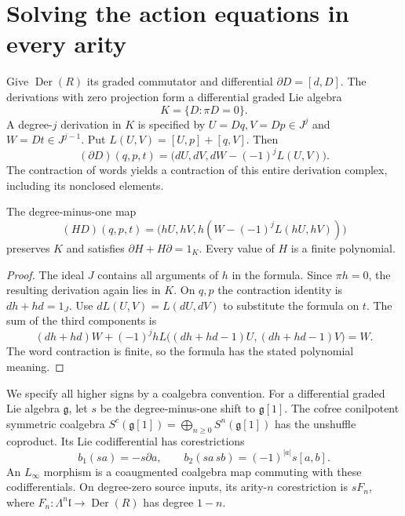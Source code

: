 \section{Solving the action equations in every arity}
\label{sec:vol2-all-arity-derived-action}

Give $\operatorname{Der}(R)$ its graded commutator and differential
$\partial D=[d,D]$. The derivations with zero projection form
a differential graded Lie algebra
\[
 K=\{D:\pi D=0\}.
\]
A degree-$j$ derivation in $K$ is specified by
$U=Dq,V=Dp\in J^j$ and $W=Dt\in J^{j-1}$.
Put $L(U,V)=[U,p]+[q,V]$. Then
\begin{equation}\label{eq:vol2-derivation-differential}
 (\partial D)(q,p,t)
   =\bigl(dU,dV,dW-(-1)^jL(U,V)\bigr).
\end{equation}
The contraction of words yields a contraction of this entire
derivation complex, including its nonclosed elements.

\begin{lemma}\label{lem:vol2-derivation-kernel-contraction}
The degree-minus-one map
\begin{equation}\label{eq:vol2-derivation-kernel-homotopy}
 (HD)(q,p,t)
   =\bigl(hU,hV,h(W-(-1)^jL(hU,hV))\bigr)
\end{equation}
preserves $K$ and satisfies $\partial H+H\partial=1_K$.
Every value of $H$ is a finite polynomial.
\end{lemma}
\begin{proof}
The ideal $J$ contains all arguments of $h$ in the formula.
Since $\pi h=0$, the resulting derivation again lies in $K$.
On $q,p$ the contraction identity is $dh+hd=1_J$.
Use $dL(U,V)=L(dU,dV)$ to substitute the formula on $t$.
The sum of the third components is
\[
 (dh+hd)W+
 (-1)^j hL\bigl((dh+hd-1)U,(dh+hd-1)V\bigr)=W.
\]
The word contraction is finite, so the formula has the stated
polynomial meaning.
\end{proof}

We specify all higher signs by a coalgebra convention.
For a differential graded Lie algebra $\mathfrak g$, let $s$
be the degree-minus-one shift to $\mathfrak g[1]$.
The cofree conilpotent symmetric coalgebra
$S^c(\mathfrak g[1])=\bigoplus_{n\geq0}S^n(\mathfrak g[1])$
has the unshuffle coproduct. Its Lie codifferential has
corestrictions
\begin{equation}\label{eq:vol2-lie-coalgebra-signs}
 b_1(sa)=-s\partial a,
 \qquad b_2(sa\,sb)=(-1)^{|a|}s[a,b].
\end{equation}
An $L_\infty$ morphism is a coaugmented coalgebra map commuting
with these codifferentials. On degree-zero source inputs, its
arity-$n$ corestriction is $sF_n$, where
$F_n:\Lambda^n\mathfrak l\to\operatorname{Der}(R)$ has degree
$1-n$.

